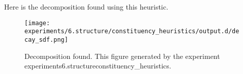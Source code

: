 Here is the decomposition found using this heuristic.

\begin{figure}
\texttt{[image: experiments/6.structure/constituency\_heuristics/output.d/decay\_sdf.png]}
\caption[Constituency heuristics]{Decomposition found. This figure generated by the experiment experiments\/6.structure\/constituency\_heuristics.}
\end{figure}

